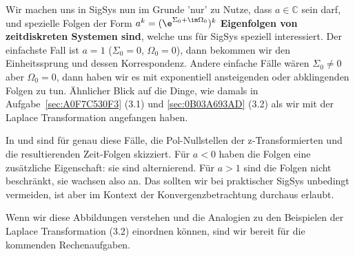 Wir machen uns in SigSys nun im Grunde 'nur' zu Nutze, dass $a\in\mathbb{C}$
sein darf, und spezielle Folgen der Form $a^k=(\e^{\Sigma_0 +\im\Omega_0})^k$
\textbf{Eigenfolgen von zeitdiskreten Systemen sind}, welche uns für SigSys speziell
interessiert.
%
Der einfachste Fall ist $a=1$ ($\Sigma_0=0$, $\Omega_0=0$),
dann bekommen wir den Einheitssprung und dessen Korrespondenz.
%
Andere einfache Fälle wären $\Sigma_0 \neq 0$ aber $\Omega_0=0$,
dann haben wir es mit exponentiell ansteigenden oder abklingenden Folgen zu tun.
Ähnlicher Blick auf die Dinge, wie damals in Aufgabe~\ref{sec:A0F7C530F3} (3.1) und \ref{sec:0B03A693AD} (3.2) als wir
mit der Laplace Transformation angefangen haben.

In  und
sind für genau diese Fälle, die Pol-Nullstellen der z-Transformierten
und die resultierenden Zeit-Folgen skizziert.
%
Für $a<0$ haben die Folgen eine zusätzliche Eigenschaft: sie sind alternierend.
Für $a>1$ sind die Folgen nicht beschränkt, sie wachsen also an. Das sollten wir
bei praktischer SigSys unbedingt vermeiden, ist aber im Kontext der
Konvergenzbetrachtung durchaus erlaubt.

Wenn wir diese Abbildungen verstehen und die Analogien zu den Beispielen
der Laplace Transformation  (3.2)
einordnen können, sind wir bereit für
die kommenden Rechenaufgaben.








\newpage
